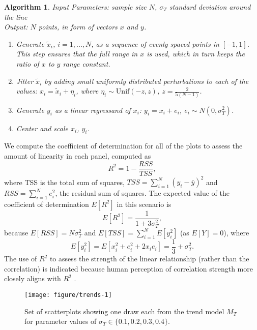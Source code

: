 \documentclass[12pt]{article}\usepackage[]{graphicx}\usepackage[]{color}
\newenvironment{knitrout}{}{} %
\newtheorem{algorithm}[theorem]{Algorithm}
\begin{document}
\begin{algorithm}\hfill\newline
  Input Parameters: sample size $N$, $\sigma_T$ standard deviation around the line \\
  Output: $N$ points, in form of vectors $x$ and $y$.
  \begin{enumerate}
    \item Generate $\tilde{x}_i$, $i=1, ..., N$, as a sequence of evenly spaced points in $[-1, 1]$.\\
    This step ensures that the full range in $x$ is used, which in turn keeps the ratio of $x$ to $y$ range constant.
    \item Jitter $\tilde{x}_i$ by adding small uniformly distributed perturbations to each of the values: $x_i = \tilde{x}_i + \eta_i$, where $\eta_i \sim \text{Unif}(-z, z)$, $z = \frac{2}{5(N-1)}$.
    \item Generate $y_i$ as a linear regressand of $x_i$: $y_i = x_i + e_i$, $e_i \sim N(0, \sigma^2_T)$.
    \item Center and scale $x_i$, $y_i$.
  \end{enumerate}
\end{algorithm}

We compute the coefficient of determination for all of the plots to assess the amount of linearity in each panel, computed as 
\begin{equation}\label{eq:linearMeasure}
R^2 = 1 - \frac{RSS}{TSS},
\end{equation}
where TSS is the total sum of squares, $TSS = \sum_{i=1}^N \left(y_i - \bar{y}\right)^2$ and $RSS = \sum_{i=1}^N e_i^2$, the residual sum of squares.
The expected value of the coefficient of determination $E\left[R^2\right]$ in this scenario is 
\[
E\left[R^2\right] =  \frac{1}{1 + 3\sigma^2_T},
\]
because
$E[RSS] = N\sigma^2_T$ and $E[TSS] = \sum_{i=1}^N E\left[y_i^2\right]$  (as $E[Y] = 0$), where 
$$
E\left[y_i^2\right] = E\left[x_i^2 + e_i^2 + 2 x_ie_i\right] = \frac{1}{3} + \sigma^2_T. 
$$
The use of $R^2$ to assess the strength of the linear relationship (rather than the correlation) is indicated because human perception of correlation strength more closely aligns with $R^2$ \citep{bobko1979perception,lewandowsky1989perception}. 

\begin{figure}[ht]
\begin{knitrout}
\color{fgcolor}

{\centering \texttt{[image: figure/trends-1]} 

}



\end{knitrout}
\caption[Parameters affecting $M_T$]{\label{fig:trends} Set of scatterplots showing one draw each from the trend model $M_T$ for parameter values of  $\sigma_T \in \{0.1, 0.2, 0.3, 0.4\}$.}
\end{figure}
\end{document}
